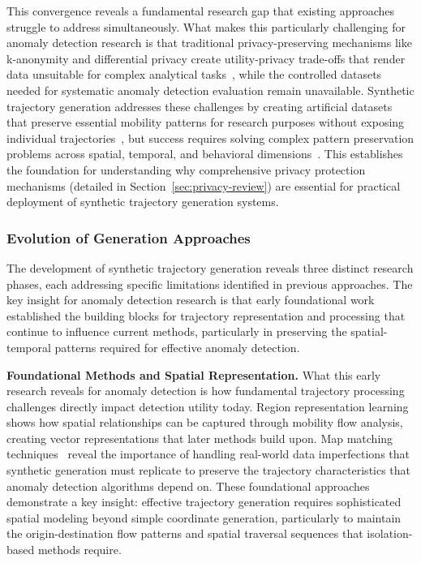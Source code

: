 \documentclass[runningheads]{llncs}
\begin{document}
This convergence reveals a fundamental research gap that existing approaches struggle to address simultaneously. What makes this particularly challenging for anomaly detection research is that traditional privacy-preserving mechanisms like k-anonymity and differential privacy create utility-privacy trade-offs that render data unsuitable for complex analytical tasks~\cite{jordon2019pate}, while the controlled datasets needed for systematic anomaly detection evaluation remain unavailable. Synthetic trajectory generation addresses these challenges by creating artificial datasets that preserve essential mobility patterns for research purposes without exposing individual trajectories~\cite{cao2021generating}, but success requires solving complex pattern preservation problems across spatial, temporal, and behavioral dimensions~\cite{kong2023mobility,merhi2024synthetic}. This establishes the foundation for understanding why comprehensive privacy protection mechanisms (detailed in Section~\ref{sec:privacy-review}) are essential for practical deployment of synthetic trajectory generation systems.

\subsubsection{Evolution of Generation Approaches}

The development of synthetic trajectory generation reveals three distinct research phases, each addressing specific limitations identified in previous approaches. The key insight for anomaly detection research is that early foundational work established the building blocks for trajectory representation and processing that continue to influence current methods, particularly in preserving the spatial-temporal patterns required for effective anomaly detection.

\textbf{Foundational Methods and Spatial Representation.} What this early research reveals for anomaly detection is how fundamental trajectory processing challenges directly impact detection utility today. Region representation learning~\cite{wang2017region} shows how spatial relationships can be captured through mobility flow analysis, creating vector representations that later methods build upon. Map matching techniques~\cite{newson2009hidden} reveal the importance of handling real-world data imperfections that synthetic generation must replicate to preserve the trajectory characteristics that anomaly detection algorithms depend on. These foundational approaches demonstrate a key insight: effective trajectory generation requires sophisticated spatial modeling beyond simple coordinate generation, particularly to maintain the origin-destination flow patterns and spatial traversal sequences that isolation-based methods require.
\end{document}
